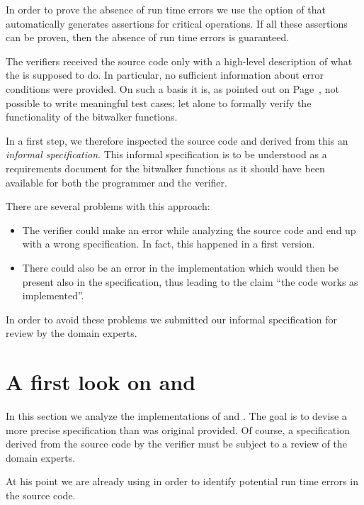 In order to prove the absence of run time errors we use
the  option of \wpframac that automatically generates \acsl
assertions for critical operations.
If all these assertions can be proven, then
the absence of run time errors is guaranteed.


\begin{framed}
The verifiers received the source code only with a high-level description
of what the \bitwalker is supposed to do.
In particular, no sufficient information about error conditions were provided.
On such a basis it is, as pointed out on Page~\pageref{lesson},
not possible to write meaningful test cases;
let alone to formally verify the functionality of the bitwalker functions.

In a first step, we therefore inspected the source code and 
derived from this an \emph{informal specification}.
This informal specification is to be understood
as a requirements document for the bitwalker functions as it should have been
available for both the programmer and the verifier.

There are several problems with this approach:
\begin{itemize}
\item
The verifier could make an error while analyzing the source code
and end up with a wrong specification. 
In fact, this happened in a first version.

\item
There could also be an error in the implementation which would then be present also
in the specification, thus leading to the claim ``the code works as implemented''.
\end{itemize}

In order to avoid these problems we submitted our informal specification
for review by the domain experts.
\end{framed}

\clearpage

\section{A first look on \peek and \poke}
\label{sec:bitwalker-first-look}

In this section we analyze the implementations of \peek 
and \poke.
The goal is to devise a more precise specification than
was original provided.
Of course, a specification derived from the source code by the verifier
must be subject to a review of the domain experts.

At his point we are already using \framacwp in order to identify
potential run time errors in the source code.

